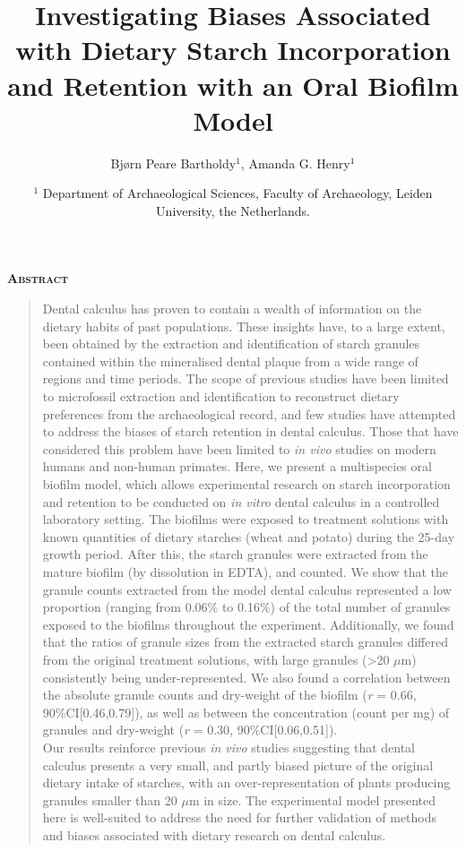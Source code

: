 \documentclass[
]{article}
\title{Investigating Biases Associated with Dietary Starch Incorporation and Retention with an Oral Biofilm Model}
\author{Bjørn Peare Bartholdy\(^1\), Amanda G. Henry\(^1\)}
\date{\(^1\) Department of Archaeological Sciences, Faculty of Archaeology, Leiden University, the Netherlands.}
\renewenvironment{abstract}
{
  \centerline
  {\large \bfseries \scshape Abstract}
  \begin{quote}
}
{
  \end{quote}
}
\begin{document}
\maketitle
\begin{abstract}
Dental calculus has proven to contain a wealth of information
on the dietary habits of past populations. These insights have, to a large extent,
been obtained by the extraction and identification of
starch granules contained within the mineralised dental plaque from a wide range
of regions and time periods. The scope of previous studies have been limited to
microfossil extraction and identification to reconstruct dietary preferences from
the archaeological record, and few studies have attempted to address the biases
of starch retention in dental calculus. Those that have considered this problem
have been limited to \emph{in vivo} studies on modern humans and non-human primates.
Here, we present a multispecies oral biofilm model, which allows experimental
research on starch incorporation and retention to be conducted on \emph{in vitro}
dental calculus in a controlled laboratory setting. The biofilms were exposed
to treatment solutions with known quantities of
dietary starches (wheat and potato) during the 25-day growth period. After this,
the starch granules were extracted from the mature biofilm (by dissolution in EDTA),
and counted. We show that the granule counts extracted from the model dental calculus
represented a low proportion (ranging from 0.06\% to 0.16\%) of the total number
of granules exposed to the biofilms throughout the experiment.
Additionally, we found that the ratios of granule sizes from the extracted
starch granules differed from the original treatment solutions, with large
granules (\textgreater20 \(\mu\)m) consistently being under-represented.
We also found a correlation
between the absolute granule counts and dry-weight of the biofilm
(\emph{r} = 0.66, 90\%CI{[}0.46,0.79{]}), as well
as between the concentration (count per mg) of granules and dry-weight
(\emph{r} = 0.30, 90\%CI{[}0.06,0.51{]}).\\
Our results reinforce previous \emph{in vivo} studies suggesting that dental calculus
presents a very small, and partly biased picture of the original dietary intake
of starches, with an over-representation of plants producing granules smaller than
20 \(\mu\)m in size. The experimental model presented here is well-suited to address
the need for further validation of methods and biases associated with dietary
research on dental calculus.
\end{abstract}
\end{document}
